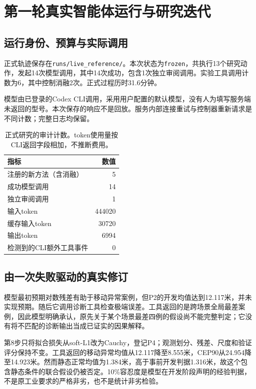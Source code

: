 \section{第一轮真实智能体运行与研究迭代}\label{sec:trace}

\subsection{运行身份、预算与实际调用}

正式轨迹保存在\texttt{runs/live\_reference/}。本次状态为\texttt{frozen}，共执行13个研究动作，发起14次模型调用，其中14次成功，包含1次独立审阅调用。实验工具调用计数为6，其中控制消融2次。正式过程历时31.6分钟。

模型由已登录的Codex CLI调用，采用用户配置的默认模型，没有人为填写服务端未返回的型号。本次保存的响应不是回放。服务内部连接重试与控制器重新请求是不同计数；完整日志均保留。

\begin{table}[H]\centering\small
\caption{正式研究的审计计数。token使用量按CLI返回字段相加，不推断费用。}

\begin{tabular}{lr}
\toprule
指标 & 数值\\
\midrule
注册的新方法（含消融） & 5\\
成功模型调用 & 14\\
独立审阅调用 & 1\\
输入token & 444020\\
缓存输入token & 30720\\
输出token & 6994\\
检测到的CLI额外工具事件 & 0\\
\bottomrule\end{tabular}\end{table}

\subsection{由一次失败驱动的真实修订}

模型最初预期对数残差有助于移动异常案例，但P2的开发均值达到12.117米，并未实现预期。随后它调用诊断工具检查极端误差。工具返回的是跨场景全局最差案例，因此模型明确承认，原先关于某个场景最差四例的假设尚不能完整判定；它没有将不匹配的诊断输出当成已证实的因果解释。

第8步只将拟合损失从soft-L1改为Cauchy，登记P4；观测划分、残差、尺度和验证评分保持不变。工具返回的移动异常均值从12.117降至8.555米，CEP90从24.954降至14.923米。然而静态正常均值为1.384米，高于事前开发判据1.316米，故这个包含静态条件的联合假设仍被否定。10\%容忍度是模型在开发阶段声明的经验判据，不是原工业要求的严格非劣，也不是统计非劣检验。

